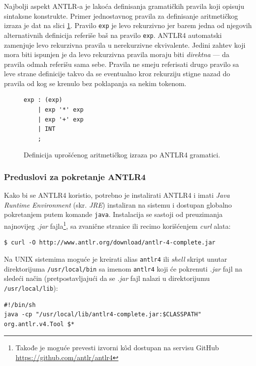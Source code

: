 Najbolji aspekt ANTLR-a je lakoća definisanja gramatičkih pravila koji opisuju sintaksne konstrukte. Primer jednostavnog pravila za definisanje aritmetičkog izraza je dat na slici \ref{fig:ANTLRExpressions}. Pravilo \texttt{exp} je levo rekurzivno jer barem jedna od njegovih alternativnih definicija referiše baš na pravilo \texttt{exp}. ANTLR4 automatski zamenjuje levo rekurzivna pravila u nerekurzivne ekvivalente. Jedini zahtev koji mora biti ispunjen je da levo rekurzivna pravila moraju biti \emph{direktna} --- da pravila odmah referišu sama sebe. Pravila ne smeju referisati drugo pravilo sa leve strane definicije takvo da se eventualno kroz rekurziju stigne nazad do pravila od kog se krenulo bez poklapanja sa nekim tokenom.

\begin{figure}[h!]
\begin{lstlisting}[language={}]
exp : (exp)
    | exp '*' exp
    | exp '+' exp
    | INT
    ;
\end{lstlisting}
\caption{Definicija uprošćenog aritmetičkog izraza po ANTLR4 gramatici.}
\label{fig:ANTLRExpressions}
\end{figure}


\subsubsection{Preduslovi za pokretanje ANTLR4}
\label{subsubsec:ANTLRInstallation}

Kako bi se ANTLR4 koristio, potrebno je instalirati ANTLR4 i imati \emph{Java Runtime Environment} (skr. \emph{JRE}) instaliran na sistemu i dostupan globalno pokretanjem putem komande \texttt{java}. Instalacija se sastoji od preuzimanja najnovijeg \emph{.jar} fajla\footnote{Takođe je moguće prevesti izvorni k\^od dostupan na servisu GitHub \url{https://github.com/antlr/antlr4}}, sa zvanične stranice \cite{ANTLR} ili recimo korišćenjem \emph{curl} alata: 
\begin{lstlisting}[language={}]
$ curl -O http://www.antlr.org/download/antlr-4-complete.jar
\end{lstlisting}

Na UNIX sistemima moguće je kreirati alias \texttt{antlr4} ili \emph{shell} skript unutar direktorijuma \texttt{/usr/local/bin} sa imenom \texttt{antlr4} koji će pokrenuti \emph{.jar} fajl na sledeći način (pretpostavljajući da se \emph{.jar} fajl nalazi u direktorijumu \texttt{/usr/local/lib}):
\begin{lstlisting}[language={}]
#!/bin/sh
java -cp "/usr/local/lib/antlr4-complete.jar:$CLASSPATH" org.antlr.v4.Tool $*
\end{lstlisting}

